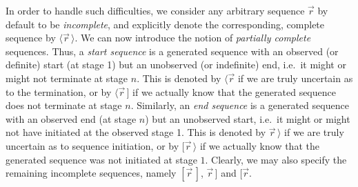 \documentclass[a4paper]{article}
\newcommand{\vr}{\vec{r}}
\begin{document}
In order to handle such difficulties, we consider any arbitrary sequence $\vr$ by default to be {\em incomplete},
and explicitly denote the corresponding, complete sequence by $\langle\vr\,\rangle$.
We can now introduce the notion of {\em partially complete} sequences. Thus, a {\em start sequence} is a generated sequence with an observed (or definite) start (at stage 1) 
but an unobserved (or indefinite) end, i.e.\ it might or might not terminate at stage $n$. This is denoted by $\langle\vr$ if we are truly uncertain as to the termination,
or by  $\langle\vr\,]$ if we actually know that the generated sequence does not terminate at stage $n$.
Similarly, an {\em end sequence} is a generated sequence with an observed end (at stage $n$) but an unobserved start, i.e.\ it might or might not have initiated at 
the observed stage 1. This is denoted by $\vr\,\rangle$ if we are truly uncertain as to sequence initiation,
or by  $[\vr\,\rangle$ if we actually know that the generated sequence was not initiated at stage $1$.
Clearly, we may also specify the remaining incomplete sequences, namely $[\vr\,]$, $\vr\,]$ and $[\vr$.
\end{document}
